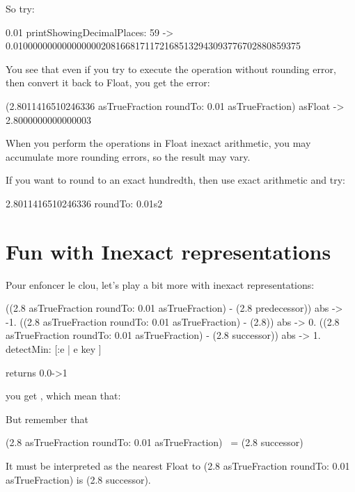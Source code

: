 \documentclass[a4paper,10pt,twoside]{book}
\begin{document}
So try:

\begin{code}{}
0.01 printShowingDecimalPlaces: 59
-> 0.01000000000000000020816681711721685132943093776702880859375
\end{code}

You see that even if you try to execute the operation without rounding
error, then convert it back to Float, you get the error:

\begin{code}{}
(2.8011416510246336 asTrueFraction roundTo: 0.01 asTrueFraction) asFloat
->  2.8000000000000003
\end{code}

When you perform the  operations in Float inexact arithmetic,
you may accumulate more rounding errors, so the result may vary.

If you want to round to an exact hundredth, then use exact arithmetic and try:

\begin{code}{}
  2.8011416510246336 roundTo: 0.01s2
\end{code}





\section{Fun with Inexact representations}
Pour enfoncer le clou, let's play a bit more with inexact representations:

\begin{code}{}
{
((2.8 asTrueFraction roundTo: 0.01 asTrueFraction) - (2.8
predecessor)) abs -> -1.
((2.8 asTrueFraction roundTo: 0.01 asTrueFraction) - (2.8)) abs -> 0.
((2.8 asTrueFraction roundTo: 0.01 asTrueFraction) - (2.8 successor)) abs -> 1.
} detectMin: [:e | e key ]

returns
	0.0->1
\end{code}

you get , which mean that:

But remember that 

\begin{code}{}
(2.8 asTrueFraction roundTo: 0.01 asTrueFraction) ~= (2.8 successor)
\end{code}

It must be interpreted as the nearest Float to (2.8 asTrueFraction
roundTo: 0.01 asTrueFraction) is (2.8 successor).
\end{document}
